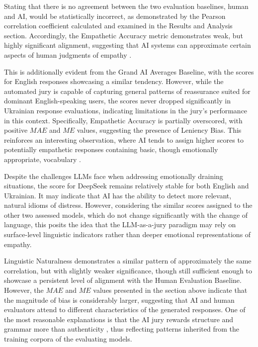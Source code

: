 \documentclass[10pt, twocolumn]{article}
\begin{document}
Stating that there is no agreement between the two evaluation baselines, human and AI, would be statistically incorrect, as demonstrated by the Pearson correlation coefficient calculated and examined in the Results and Analysis section. Accordingly, the Empathetic Accuracy metric demonstrates weak, but highly significant alignment, suggesting that AI systems can approximate certain aspects of human judgments of empathy \cite{paech2024eqbench, malik-etal-2025-llms}.

This is additionally evident from the Grand AI Averages Baseline, with the scores for English responses showcasing a similar tendency. However, while the automated jury is capable of capturing general patterns of reassurance suited for dominant English-speaking users, the scores never dropped significantly in Ukrainian response evaluations, indicating limitations in the jury's performance in this context. Specifically, Empathetic Accuracy is partially overscored, with positive $MAE$ and $ME$ values, suggesting the presence of Leniency Bias. This reinforces an interesting observation, where AI tends to assign higher scores to potentially empathetic responses containing basic, though emotionally appropriate, vocabulary \cite{paech2024eqbench, malik-etal-2025-llms}.

Despite the challenges LLMs face when addressing emotionally draining situations, the score for DeepSeek remains relatively stable for both English and Ukrainian. It may indicate that AI has the ability to detect more relevant, natural idioms of distress. However, considering the similar scores assigned to the other two assessed models, which do not change significantly with the change of language, this posits the idea that the LLM-as-a-jury paradigm may rely on surface-level linguistic indicators rather than deeper emotional representations of empathy.

Linguistic Naturalness demonstrates a similar pattern of approximately the same correlation, but with slightly weaker significance, though still sufficient enough to showcase a persistent level of alignment with the Human Evaluation Baseline. However, the $MAE$ and $ME$ values presented in the section above indicate that the magnitude of bias is considerably larger, suggesting that AI and human evaluators attend to different characteristics of the generated responses. One of the most reasonable explanations is that the AI jury rewards structure and grammar more than authenticity \cite{xing2024evaluating, 
han2025mubenchassessmentmultilingualcapabilities}, thus reflecting patterns inherited from the training corpora of the evaluating models.
\end{document}
